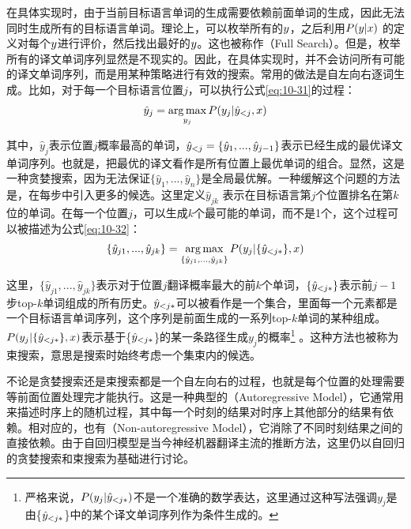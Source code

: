 \parinterval 在具体实现时，由于当前目标语言单词的生成需要依赖前面单词的生成，因此无法同时生成所有的目标语言单词。理论上，可以枚举所有的${{y}}$，之后利用${P}({{y}} | {{x}})$ 的定义对每个${{y}}$进行评价，然后找出最好的${{y}}$。这也被称作{\small{}}（Full Search）。但是，枚举所有的译文单词序列显然是不现实的。因此，在具体实现时，并不会访问所有可能的译文单词序列，而是用某种策略进行有效的搜索。常用的做法是自左向右逐词生成。比如，对于每一个目标语言位置$j$，可以执行公式\eqref{eq:10-31}的过程：
\begin{eqnarray}
\hat{y}_j = \operatorname*{arg\,max}_{y_j} {P}(y_j | \hat{{{y}}}_{<j} , {{x}})
\label{eq:10-31}
\end{eqnarray}

\noindent 其中，$\hat{y}_j$表示位置$j$概率最高的单词，$\hat{{{y}}}_{<j} = \{ \hat{y}_1,...,\hat{y}_{j-1} \}$表示已经生成的最优译文单词序列。也就是，把最优的译文看作是所有位置上最优单词的组合。显然，这是一种贪婪搜索，因为无法保证$\{ \hat{y}_1,...,\hat{y}_{n} \}$是全局最优解。一种缓解这个问题的方法是，在每步中引入更多的候选。这里定义$\hat{y}_{jk} $ 表示在目标语言第$j$个位置排名在第$k$位的单词。在每一个位置$j$，可以生成$k$个最可能的单词，而不是1个，这个过程可以被描述为公式\eqref{eq:10-32}：
\begin{eqnarray}
\{ \hat{y}_{j1},...,\hat{y}_{jk} \} = \operatorname*{arg\,max}_{ \{ \hat{y}_{j1},...,\hat{y}_{jk} \} }
{P}(y_j | \{ \hat{{{y}}}_{<{j\ast}} \},{{x}})
\label{eq:10-32}
\end{eqnarray}

\noindent 这里，$\{ \hat{y}_{j1},...,\hat{y}_{jk} \}$表示对于位置$j$翻译概率最大的前$k$个单词，$\{ \hat{{{y}}}_{<j\ast} \}$表示前$j-1$步top-$k$单词组成的所有历史。${\hat{{{y}}}_{<j\ast}}$可以被看作是一个集合，里面每一个元素都是一个目标语言单词序列，这个序列是前面生成的一系列top-$k$单词的某种组成。${P}(y_j | \{ \hat{{{y}}}_{<{j\ast}} \},{{x}})$表示基于\{$ \hat{{{y}}}_{<j\ast} $\}的某一条路径生成$y_j$的概率\footnote{严格来说，$ {P} (y_j | {\hat{{{y}}}_{<j\ast} })$不是一个准确的数学表达，这里通过这种写法强调$y_j$是由\{$ \hat{{{y}}}_{<j\ast} $\}中的某个译文单词序列作为条件生成的。} 。这种方法也被称为束搜索，意思是搜索时始终考虑一个集束内的候选。

\parinterval 不论是贪婪搜索还是束搜索都是一个自左向右的过程，也就是每个位置的处理需要等前面位置处理完才能执行。这是一种典型的{\small{}}（Autoregressive Model），它通常用来描述时序上的随机过程，其中每一个时刻的结果对时序上其他部分的结果有依赖。相对应的，也有{\small{}}（Non-autoregressive Model），它消除了不同时刻结果之间的直接依赖。由于自回归模型是当今神经机器翻译主流的推断方法，这里仍以自回归的贪婪搜索和束搜索为基础进行讨论。

